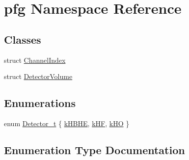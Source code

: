 \hypertarget{namespacepfg}{}\section{pfg Namespace Reference}
\label{namespacepfg}
\subsection*{Classes}
\begin{DoxyCompactItemize}
\item 
struct \hyperlink{structpfg_1_1_channel_index}{Channel\+Index}
\item 
struct \hyperlink{structpfg_1_1_detector_volume}{Detector\+Volume}
\end{DoxyCompactItemize}
\subsection*{Enumerations}
\begin{DoxyCompactItemize}
\item 
enum \hyperlink{namespacepfg_a90b6d47b5ff56bc3ebabb0f6b6088d60}{Detector\+\_\+t} \{ \hyperlink{namespacepfg_a90b6d47b5ff56bc3ebabb0f6b6088d60a6dd4ec12d707ea8f3768d5ce35598ef7}{k\+H\+B\+H\+E}, 
\hyperlink{namespacepfg_a90b6d47b5ff56bc3ebabb0f6b6088d60af0455c45bb2be69b625695b04157afab}{k\+H\+F}, 
\hyperlink{namespacepfg_a90b6d47b5ff56bc3ebabb0f6b6088d60a438afa76c58d2c9c8df4e1b8f90f4789}{k\+H\+O}
 \}
\end{DoxyCompactItemize}


\subsection{Enumeration Type Documentation}
\hypertarget{namespacepfg_a90b6d47b5ff56bc3ebabb0f6b6088d60}{}
